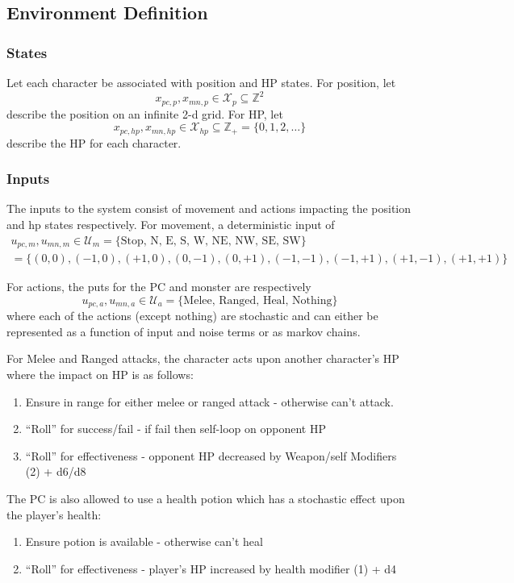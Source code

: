 \documentclass[9pt, onecolumn]{report}
\newcommand{\Z}{\mathbb{Z}}
\begin{document}
\subsection{Environment Definition}
\subsubsection{States}
Let each character be associated with position and HP states.
For position, let \[
    x_{pc,p}, x_{mn,p} \in \mathcal{X}_{p} \subseteq \Z^{2}
\] describe the position on an infinite 2-d grid.
For HP, let \[
    x_{pc,hp}, x_{mn,hp} \in \mathcal{X}_{hp} \subseteq \Z_+ = \{0, 1, 2, \dots\}
\] describe the HP for each character.

\subsubsection{Inputs}
The inputs to the system consist of movement and actions impacting the position and hp states respectively.
For movement, a deterministic input of 
\begin{multline}
    u_{pc,m}, u_{mn,m} \in \mathcal{U}_{m} = \text{\{Stop, N, E, S, W, NE, NW, SE, SW\}}\\
    =\{(0,0),(-1,0), (+1,0), (0,-1),(0,+1), (-1,-1), (-1,+1), (+1,-1),(+1,+1)\}
\end{multline}

For actions, the puts for the PC and monster are respectively \[
    u_{pc,a}, u_{mn,a} \in \mathcal{U}_{a} = \{\text{Melee, Ranged, Heal, Nothing}\}
\] where each of the actions (except nothing) are stochastic and can either be represented as a function of input and noise terms or as markov chains.

For Melee and Ranged attacks, the character acts upon another character's HP where the impact on HP is as follows:
\begin{enumerate}
    \item Ensure in range for either melee or ranged attack - otherwise can't attack.
    \item ``Roll'' for success/fail - if fail then self-loop on opponent HP
    \item ``Roll'' for effectiveness - opponent HP decreased by Weapon/self Modifiers (2) + d6/d8
\end{enumerate}

The PC is also allowed to use a health potion which has a stochastic effect upon the player's health:
\begin{enumerate}
    \item Ensure potion is available - otherwise can't heal
    \item ``Roll'' for effectiveness - player's HP increased by health modifier (1) + d4
\end{enumerate}
\end{document}
